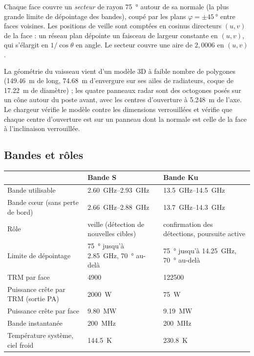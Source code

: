 \documentclass[11pt,a4paper]{article}
\begin{document}
Chaque face couvre un \emph{secteur} de rayon \SI{75}{\degree} autour de sa normale (la plus grande limite de
dépointage des bandes), coupé par les plans $\varphi = \pm\SI{45}{\degree}$ entre faces voisines. Les positions de
veille sont comptées en cosinus directeurs $(u, v)$ de la face : un réseau plan dépointe un faisceau de largeur
constante en $(u,v)$, qui s'élargit en $1/\cos\theta$ en angle. Le secteur couvre une aire de $2,0006$ en $(u,v)$.

La géométrie du vaisseau vient d'un modèle 3D à faible nombre de polygones (\SI{149.46}{m} de long, \SI{74.68}{m}
d'envergure sur ses ailes de radiateurs, coque de \SI{17.22}{m} de diamètre) ; les quatre panneaux radar sont des
octogones posés sur un cône autour du poste avant, avec les centres d'ouverture à \SI{5.248}{m} de l'axe. Le chargeur
vérifie le modèle contre les dimensions verrouillées et vérifie que chaque centre d'ouverture est sur un panneau dont
la normale est celle de la face à l'inclinaison verrouillée.

\subsection{Bandes et rôles}
\begin{center}
\begin{tabularx}{\linewidth}{@{}lLL@{}}
\toprule
 & \textbf{Bande S} & \textbf{Bande Ku}\\
\midrule
Bande utilisable & \SIrange{2.60}{2.93}{GHz} & \SIrange{13.5}{14.5}{GHz}\\
Bande c\oe{}ur (sans perte de bord) & \SIrange{2.66}{2.88}{GHz} & \SIrange{13.7}{14.3}{GHz}\\
Rôle & veille (détection de nouvelles cibles) & confirmation des détections, poursuite active\\
Limite de dépointage & \SI{75}{\degree} jusqu'à \SI{2.85}{GHz}, \SI{70}{\degree} au-delà & \SI{75}{\degree} jusqu'à \SI{14.25}{GHz}, \SI{70}{\degree} au-delà\\
TRM par face & \num{4900} & \num{122500}\\
Puissance crête par TRM (sortie PA) & \SI{2000}{W} & \SI{75}{W}\\
Puissance crête par face & \SI{9.80}{MW} & \SI{9.19}{MW}\\
Bande instantanée & \SI{200}{MHz} & \SI{200}{MHz}\\
Température système, ciel froid & \SI{144.5}{K} & \SI{230.8}{K}\\
\bottomrule
\end{tabularx}
\end{center}
\end{document}
